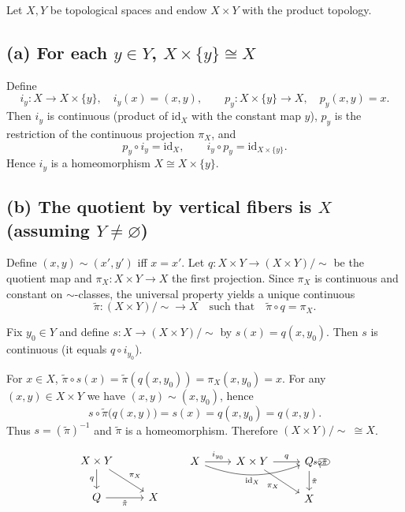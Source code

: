 \documentclass[12pt,a4paper]{article}
\theoremstyle{plain}
\theoremstyle{definition}
\theoremstyle{remark}
\theoremstyle{remark}
\begin{document}
	Let $X,Y$ be topological spaces and endow $X\times Y$ with the product topology.
	
	\subsection*{(a) For each $y\in Y$, $X\times\{y\}\cong X$}
	Define
	\[
	i_y:X\to X\times\{y\},\quad i_y(x)=(x,y),
	\qquad
	p_y:X\times\{y\}\to X,\quad p_y(x,y)=x.
	\]
	Then $i_y$ is continuous (product of $\mathrm{id}_X$ with the constant map $y$),
	$p_y$ is the restriction of the continuous projection $\pi_X$, and
	\[
	p_y\circ i_y=\mathrm{id}_X,\qquad i_y\circ p_y=\mathrm{id}_{X\times\{y\}}.
	\]
	Hence $i_y$ is a homeomorphism $X\cong X\times\{y\}$.
	
	\subsection*{(b) The quotient by vertical fibers is $X$ (assuming $Y\neq\varnothing$)}
	Define $(x,y)\sim(x',y')$ iff $x=x'$. Let $q:X\times Y\to (X\times Y)/\!\sim$ be the quotient map and
	$\pi_X:X\times Y\to X$ the first projection. Since $\pi_X$ is continuous and constant on $\sim$-classes,
	the universal property yields a unique continuous
	\[
	\tilde\pi:(X\times Y)/\!\sim \longrightarrow X \quad\text{such that}\quad \tilde\pi\circ q=\pi_X.
	\]
	
	Fix $y_0\in Y$ and define $s:X\to (X\times Y)/\!\sim$ by $s(x)=q(x,y_0)$.
	Then $s$ is continuous (it equals $q\circ i_{y_0}$).
	
	For $x\in X$, $\tilde\pi\circ s(x)=\tilde\pi(q(x,y_0))=\pi_X(x,y_0)=x$.
	For any $(x,y)\in X\times Y$ we have $(x,y)\sim(x,y_0)$, hence
	\[
	s\circ\tilde\pi\big(q(x,y)\big)=s(x)=q(x,y_0)=q(x,y).
	\]
	Thus $s=(\tilde\pi)^{-1}$ and $\tilde\pi$ is a homeomorphism.
	Therefore $(X\times Y)/\!\sim\ \cong X$.
	
	\[
	\begin{tikzcd}
		X\times Y \arrow[d, "q"'] \arrow[dr, "\pi_X"] & \\
		Q \arrow[r, "\tilde{\pi}"'] & X
	\end{tikzcd}
	\qquad
	\begin{tikzcd}
		X \arrow[r, "i_{y_0}"] \arrow[rr, bend right=20, "\mathrm{id}_X"'] & 
		X\times Y \arrow[r, "q"] \arrow[dr, "\pi_X"'] &
		Q \arrow[d, "\tilde{\pi}"] \arrow[loop right, "s\circ\tilde{\pi}"'] \\
		& & X
	\end{tikzcd}
	\]
	
\end{document}
